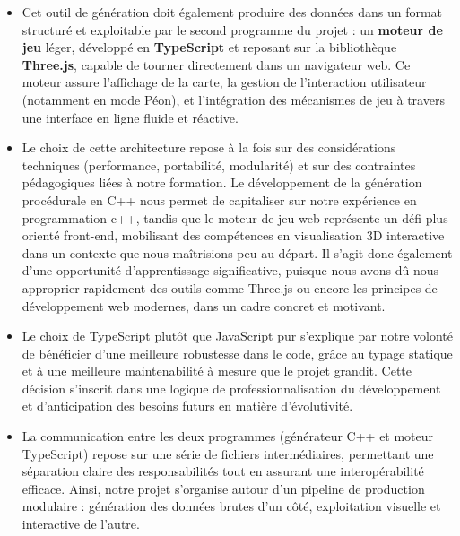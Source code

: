 \begin{itemize}
    \item Cet outil de génération doit également produire des données dans un format structuré et exploitable par le second programme du projet : un \textbf{moteur de jeu} léger, développé en \textbf{TypeScript} et reposant sur la bibliothèque \textbf{Three.js}, capable de tourner directement dans un navigateur web. Ce moteur assure l’affichage de la carte, la gestion de l’interaction utilisateur (notamment en mode Péon), et l'intégration des mécanismes de jeu à travers une interface en ligne fluide et réactive.
    \\
    \item Le choix de cette architecture repose à la fois sur des considérations techniques (performance, portabilité, modularité) et sur des contraintes pédagogiques liées à notre formation. Le développement de la génération procédurale en C++ nous permet de capitaliser sur notre expérience en programmation c++, tandis que le moteur de jeu web représente un défi plus orienté front-end, mobilisant des compétences en visualisation 3D interactive dans un contexte que nous maîtrisions peu au départ. Il s'agit donc également d'une opportunité d’apprentissage significative, puisque nous avons dû nous approprier rapidement des outils comme Three.js ou encore les principes de développement web modernes, dans un cadre concret et motivant.
    \\
    \item Le choix de TypeScript plutôt que JavaScript pur s’explique par notre volonté de bénéficier d’une meilleure robustesse dans le code, grâce au typage statique et à une meilleure maintenabilité à mesure que le projet grandit. Cette décision s’inscrit dans une logique de professionnalisation du développement et d’anticipation des besoins futurs en matière d’évolutivité.
    \\
    \item La communication entre les deux programmes (générateur C++ et moteur TypeScript) repose sur une série de fichiers intermédiaires, permettant une séparation claire des responsabilités tout en assurant une interopérabilité efficace.
    Ainsi, notre projet s’organise autour d’un pipeline de production modulaire : génération des données brutes d’un côté, exploitation visuelle et interactive de l’autre.
\end{itemize}











